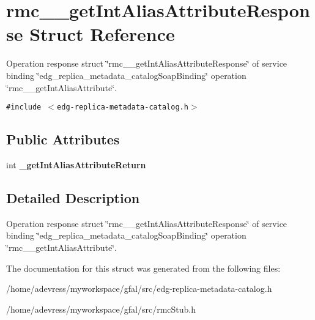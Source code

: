 \section{rmc\_\-\_\-get\-Int\-Alias\-Attribute\-Response Struct Reference}
\label{structrmc____getIntAliasAttributeResponse}
Operation response struct \char`\"{}rmc\_\-\_\-get\-Int\-Alias\-Attribute\-Response\char`\"{} of service binding \char`\"{}edg\_\-replica\_\-metadata\_\-catalog\-Soap\-Binding\char`\"{} operation \char`\"{}rmc\_\-\_\-get\-Int\-Alias\-Attribute\char`\"{}.  


{\tt \#include $<$edg-replica-metadata-catalog.h$>$}

\subsection*{Public Attributes}
\begin{CompactItemize}
\item 
int \textbf{\_\-get\-Int\-Alias\-Attribute\-Return}\label{structrmc____getIntAliasAttributeResponse_41f2e450bfd7ae979543f48032db37f9}

\end{CompactItemize}


\subsection{Detailed Description}
Operation response struct \char`\"{}rmc\_\-\_\-get\-Int\-Alias\-Attribute\-Response\char`\"{} of service binding \char`\"{}edg\_\-replica\_\-metadata\_\-catalog\-Soap\-Binding\char`\"{} operation \char`\"{}rmc\_\-\_\-get\-Int\-Alias\-Attribute\char`\"{}. 



The documentation for this struct was generated from the following files:\begin{CompactItemize}
\item 
/home/adevress/myworkspace/gfal/src/edg-replica-metadata-catalog.h\item 
/home/adevress/myworkspace/gfal/src/rmc\-Stub.h\end{CompactItemize}
